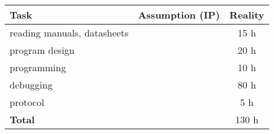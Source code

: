 \documentclass[12pt,a4paper,titlepage,oneside]{article}
\begin{document}
\begin{tabular}{|l|c|c|}\hline
	Task & Assumption (IP) & Reality \\ \hline

	reading manuals, datasheets &  & 15 h\\
	program design              &  & 20 h\\
	programming                 &  & 10 h\\
	debugging                   &  & 80 h\\
	protocol                    &  &  5 h\\ \hline

	\textbf{Total}              &  &130 h\\ \hline
\end{tabular}


\newpage
\end{document}
